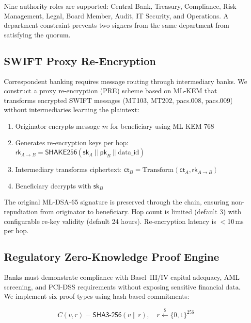 \documentclass[conference,10pt]{IEEEtran}
\newcommand{\mlkem}{\textsf{ML-KEM}}
\newcommand{\mldsa}{\textsf{ML-DSA}}
\newcommand{\shake}{\textsf{SHAKE256}}
\newcommand{\shaiii}{\textsf{SHA3-256}}
\begin{document}
Nine authority roles are supported: Central Bank, Treasury, Compliance, Risk Management, Legal, Board Member, Audit, IT Security, and Operations. A department constraint prevents two signers from the same department from satisfying the quorum.

\subsection{SWIFT Proxy Re-Encryption}

Correspondent banking requires message routing through intermediary banks. We construct a proxy re-encryption (PRE) scheme based on \mlkem{} that transforms encrypted SWIFT messages (MT103, MT202, pacs.008, pacs.009) without intermediaries learning the plaintext:

\begin{enumerate}
    \item Originator encrypts message $m$ for beneficiary using \mlkem{}-768
    \item Generates re-encryption keys per hop: $\mathsf{rk}_{A \to B} = \shake{}(\mathsf{sk}_A \| \mathsf{pk}_B \| \text{data\_id})$
    \item Intermediary transforms ciphertext: $\mathsf{ct}_B = \text{Transform}(\mathsf{ct}_A, \mathsf{rk}_{A \to B})$
    \item Beneficiary decrypts with $\mathsf{sk}_B$
\end{enumerate}

The original \mldsa{}-65 signature is preserved through the chain, ensuring non-repudiation from originator to beneficiary. Hop count is limited (default 3) with configurable re-key validity (default 24 hours). Re-encryption latency is $<$10\,ms per hop.

\subsection{Regulatory Zero-Knowledge Proof Engine}

Banks must demonstrate compliance with Basel~III/IV capital adequacy, AML screening, and PCI-DSS requirements without exposing sensitive financial data. We implement six proof types using hash-based commitments:

\begin{equation}
    C(v, r) = \shaiii{}(v \| r), \quad r \xleftarrow{\$} \{0,1\}^{256}
\end{equation}
\end{document}
